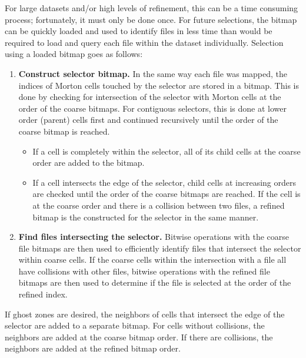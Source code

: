 \documentclass[apjl]{emulateapj}
\begin{document}
For large datasets and/or high levels of refinement, this can be a time consuming process; fortunately, it must only be done once. For future selections, the bitmap can be quickly loaded and used to identify files in less time than would be required to load and query each file within the dataset individually. Selection using a loaded bitmap goes as follows:
\begin{enumerate}
\item {\bf Construct selector bitmap.} In the same way each file was mapped, the indices of Morton cells touched by the selector are stored in a bitmap. This is done by checking for intersection of the selector with Morton cells at the order of the coarse bitmaps. For contiguous selectors, this is done at lower order (parent) cells first and continued recursively until the order of the coarse bitmap is reached. 
\begin{itemize}
\item If a cell is completely within the selector, all of its child cells at the coarse order are added to the bitmap. 
\item If a cell intersects the edge of the selector, child cells at increasing orders are checked until the order of the coarse bitmaps are reached. If the cell is at the coarse order and there is a collision between two files, a refined bitmap is the constructed for the selector in the same manner.
\end{itemize}
\item {\bf Find files intersecting the selector.} Bitwise operations with the coarse file bitmaps are then used to efficiently identify files that intersect the selector within coarse cells. If the coarse cells within the intersection with a file all have collisions with other files, bitwise operations with the refined file bitmaps are then used to determine if the file is selected at the order of the refined index.
\end{enumerate}

If ghost zones are desired, the neighbors of cells that intersect the edge of the selector are added to a separate bitmap. For cells without collisions, the neighbors are added at the coarse bitmap order. If there are collisions, the neighbors are added at the refined bitmap order.

\end{document}
